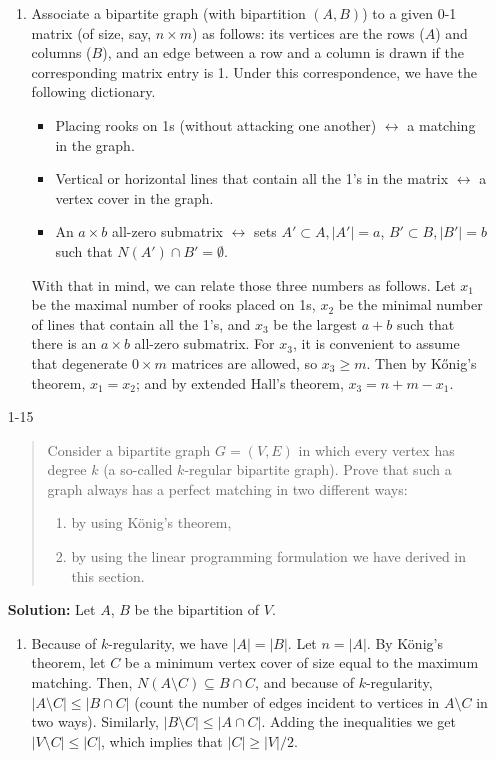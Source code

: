 \documentclass[12pt]{article}
\begin{document}
\begin{enumerate}
\begin{enumerate}
\item Associate a bipartite graph (with bipartition $(A,B)$) to a given 0-1 matrix (of size, say, $n\times m$) as follows: its vertices are the rows ($A$) and columns ($B$), and an edge between a row and a column is drawn if the corresponding matrix entry is 1. Under this correspondence, we have the following dictionary.
    \begin{itemize}
      \item Placing rooks on 1s (without attacking one another) $\longleftrightarrow$ a matching in the graph.
      \item Vertical or horizontal lines that contain all the 1's in the matrix $\longleftrightarrow$ a vertex cover in the graph.
      \item An $a\times b$ all-zero submatrix $\longleftrightarrow$ sets $A' \subset A, |A'|=a$, $B' \subset B, |B'|=b$ such that $N(A') \cap B' = \emptyset$.
    \end{itemize}
    With that in mind, we can relate those three numbers as follows. Let $x_1$ be the maximal number of rooks placed on 1s, $x_2$ be the minimal number of lines that contain all the 1's, and $x_3$ be the largest $a+b$ such that there is an $a\times b$ all-zero submatrix. For $x_3$, it is convenient to assume that degenerate $0\times m$ matrices are allowed, so $x_3 \ge m$. Then by K\H{o}nig's theorem, $x_1 = x_2$; and by extended Hall's theorem, $x_3 = n+m - x_1$.
\end{enumerate}


\iffalse
\item[1-15]
\begin{quote}
Consider a bipartite graph $G=(V,E)$ in which every vertex has degree
$k$ (a so-called $k$-regular bipartite graph). Prove that such a graph
always has a perfect matching in two different ways:
\begin{enumerate}
\item
by using K\"onig's theorem,
\item
by using the linear programming formulation we have derived in this
section.
\end{enumerate}
\end{quote}

\textbf{Solution: }
Let $A$, $B$ be the bipartition of $V$.
\begin{enumerate}
  \item  Because of
  $k$-regularity, we have $|A| = |B|$. Let $n = |A|$.
  By K\"{o}nig's theorem, let $C$ be a minimum vertex cover of
  size equal to the maximum matching. Then, $N(A \setminus C)
  \subseteq B \cap C$, and because of $k$-regularity, $|A  \setminus C| \leq |B \cap C|$ (count the number of edges incident to vertices in $A\setminus C$ in two ways). Similarly, $|B
  \setminus C| \leq |A \cap C|$. Adding the inequalities we get $|V \setminus C|
  \leq |C|$, which implies that $|C| \geq |V|/2$.


\end{enumerate}
\end{enumerate}
\end{document}
